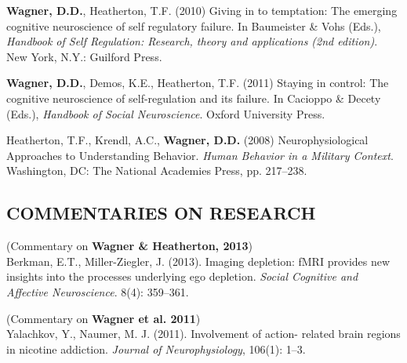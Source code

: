 \documentclass[11pt,letter,roman]{moderncv}
\begin{document}
\begin{bibenum}
\item \textbf{Wagner, D.D.}, Heatherton, T.F. (2010) Giving in to temptation: The emerging cognitive neuroscience of self regulatory failure. In Baumeister \& Vohs (Eds.), \emph{Handbook of Self Regulation: Research, theory and applications (2nd edition)}. New York, N.Y.: Guilford Press. 

\item \textbf{Wagner, D.D.}, Demos, K.E., Heatherton, T.F. (2011) Staying in control: The
cognitive neuroscience of self-regulation and its failure. In Cacioppo \& Decety
(Eds.), \emph{Handbook of Social Neuroscience}. Oxford University Press. 

\item Heatherton, T.F., Krendl, A.C., \textbf{Wagner, D.D.} (2008) Neurophysiological Approaches to Understanding Behavior. \emph{Human Behavior in a Military Context}. Washington, DC: The National Academies Press, pp. 217--238.

\end{bibenum}

\cvitem{}{}
\cvitem{}{}
\subsection{COMMENTARIES ON RESEARCH}
\begin{bibenum}

\item (Commentary on \textbf{Wagner \& Heatherton, 2013}) \\ Berkman, E.T., Miller-Ziegler, J. (2013). Imaging depletion: fMRI provides new insights into the processes underlying ego depletion. \emph{Social Cognitive and Affective Neuroscience}. 8(4): 359--361.

\item (Commentary on \textbf{Wagner et al. 2011}) \\ Yalachkov, Y., Naumer, M. J. (2011). Involvement of action- related brain regions in nicotine addiction. \emph{Journal of Neurophysiology}, 106(1): 1--3.
\end{bibenum}
\end{document}
